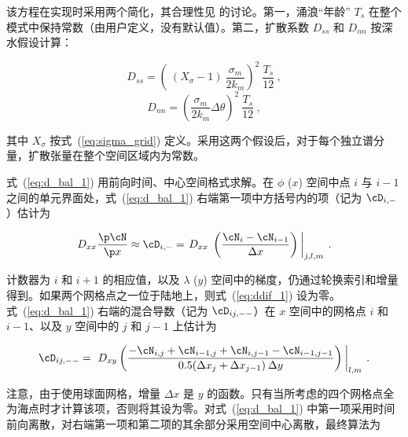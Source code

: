 \noindent
该方程在实现时采用两个简化，其合理性见 \cite{tol:OMB95} 的讨论。第一，涌浪“年龄” $T_s$ 在整个模式中保持常数（由用户定义，没有默认值）。第二，扩散系数 $D_{ss}$ 和 $D_{nn}$ 按深水假设计算：


\begin{equation}
D_{ss} = \left ( \: (X_\sigma-1) \: \frac{\sigma_m}{2 k_m} \right )^2
\: \frac{T_s}{12} \: , \label{eq:Dss_d} \end{equation} \begin{equation}
D_{nn} =  \left ( \frac{\sigma_m}{2 k_m} \Delta \theta \right )^2
\: \frac{T_s}{12} \: , \label{eq:Dnn_d} \end{equation}

\noindent
其中 $X_\sigma$ 按式~(\ref{eq:sigma_grid}) 定义。采用这两个假设后，对于每个独立谱分量，扩散张量在整个空间区域内为常数。

式~(\ref{eq:d_bal_1}) 用前向时间、中心空间格式求解。在 $\phi$ ($x$) 空间中点 $i$ 与 $i-1$ 之间的单元界面处，式~(\ref{eq:d_bal_1}) 右端第一项中方括号内的项（记为 $\cD_{i,-}$）估计为


\begin{equation}
D_{xx} \frac{\p \cN}{\p x} \approx \cD_{i,-} =
\left . D_{xx} \; \left ( \frac{\cN_i - \cN_{i-1}}{\Delta x} \right ) \: 
\right |_{j,l,m} \: . \label{eq:ddif_1} \end{equation}

\noindent
计数器为 $i$ 和 $i+1$ 的相应值，以及 $\lambda$ ($y$) 空间中的梯度，仍通过轮换索引和增量得到。如果两个网格点之一位于陆地上，则式~(\ref{eq:ddif_1}) 设为零。式~(\ref{eq:d_bal_1}) 右端的混合导数（记为 $\cD_{ij,--}$）在 $x$ 空间中的网格点 $i$ 和 $i-1$、以及 $y$ 空间中的 $j$ 和 $j-1$ 上估计为


\begin{equation}
\cD_{ij,--} = \left . \: D_{xy} 
\left ( \frac{- \cN_{i,j} + \cN_{i-1,j} +
              \cN_{i,j-1} - \cN_{i-1,j-1}}
           {0.5 ( \Delta x_j + \Delta x_{j-1} ) \: \Delta y}
              \right ) \: \right |_{l,m} 
\: . \label{eq:ddif_2} \end{equation}

\noindent
注意，由于使用球面网格，增量 $\Delta x$ 是 $y$ 的函数。只有当所考虑的四个网格点全为海点时才计算该项，否则将其设为零。对式~(\ref{eq:d_bal_1}) 中第一项采用时间前向离散，对右端第一项和第二项的其余部分采用空间中心离散，最终算法为

